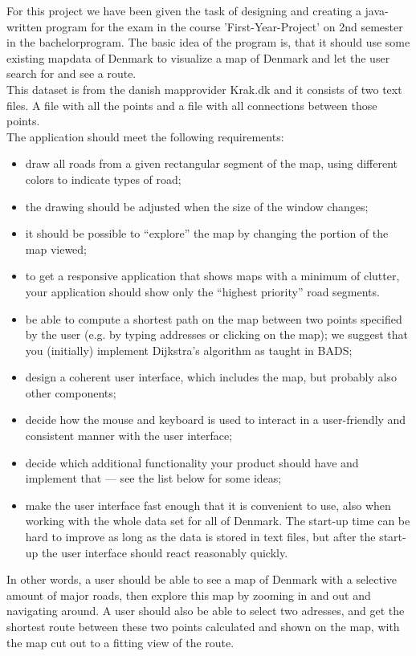 \documentclass[a4paper,10pt,titlepage]{article}
\begin{document}
		For this project we have been given the task of designing and creating a java-written program 
		for the exam in the course 'First-Year-Project' on 2nd semester in the bachelorprogram. The basic idea of the 
		program is, that it should use some existing mapdata of Denmark to visualize a map of Denmark and let the user search for and see a route. 
		\\This dataset is from the danish mapprovider Krak.dk and it consists of two text files. A file with all the points 
		and a file with all connections between those points.  
		\\The application should meet the following requirements:
		\begin{itemize}
		\item draw all roads from a given rectangular segment of the map, using different colors to indicate types of road;
\item the drawing should be adjusted when the size of the window changes;
\item it should be possible to “explore” the map by changing the portion of the map viewed;
\item to get a responsive application that shows maps with a minimum of clutter, your application should show only the “highest priority” road segments.
\item be able to compute a shortest path on the map between two points specified by the user (e.g. by typing addresses or clicking on the map); we suggest that you (initially) implement Dijkstra’s algorithm as taught in BADS;
\item design a coherent user interface, which includes the map, but probably also other components;
\item decide how the mouse and keyboard is used to interact in a user-friendly and consistent
manner with the user interface;
\item decide which additional functionality your product should have and implement that — see the list below for some ideas;
\item make the user interface fast enough that it is convenient to use, also when working with the whole data set for all of Denmark. The start-up time can be hard to improve as long as the data is stored in text files, but after the start-up the user interface should react reasonably quickly.
		\end{itemize}
		
		In other words, a user should be able to see a map of Denmark with a selective amount of major roads, then explore this map by zooming in and out and navigating around. A user should also be able to select two adresses, and get the shortest route between these two points calculated and shown on the map, with the map cut out to a fitting view of the route.
		 
\end{document}
